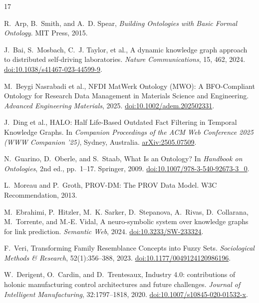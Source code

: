 \documentclass{iosart2x}
\begin{document}

\begin{thebibliography}{17}

R.~Arp, B.~Smith, and A.~D. Spear, \textit{Building Ontologies with Basic Formal Ontology}. MIT Press, 2015.

J.~Bai, S.~Mosbach, C.~J. Taylor, et al., A dynamic knowledge graph approach to distributed self-driving laboratories. \textit{Nature Communications}, 15, 462, 2024. \href{https://doi.org/10.1038/s41467-023-44599-9}{doi:10.1038/s41467-023-44599-9}.

M.~Beygi Nasrabadi et al., NFDI MatWerk Ontology (MWO): A BFO-Compliant Ontology for Research Data Management in Materials Science and Engineering. \textit{Advanced Engineering Materials}, 2025. \href{https://doi.org/10.1002/adem.202502331}{doi:10.1002/adem.202502331}.

J.~Ding et al., HALO: Half Life-Based Outdated Fact Filtering in Temporal Knowledge Graphs. In \textit{Companion Proceedings of the ACM Web Conference 2025 (WWW Companion '25)}, Sydney, Australia. \href{https://arxiv.org/abs/2505.07509}{arXiv:2505.07509}.

N.~Guarino, D.~Oberle, and S.~Staab, What Is an Ontology? In \textit{Handbook on Ontologies}, 2nd ed., pp.~1--17. Springer, 2009. \href{https://doi.org/10.1007/978-3-540-92673-3_0}{doi:10.1007/978-3-540-92673-3\_0}.

L.~Moreau and P.~Groth, PROV-DM: The PROV Data Model. W3C Recommendation, 2013.

M.~Ebrahimi, P.~Hitzler, M.~K. Sarker, D.~Stepanova, A.~Rivas, D.~Collarana, M.~Torrente, and M.-E. Vidal, A neuro-symbolic system over knowledge graphs for link prediction. \textit{Semantic Web}, 2024. \href{https://doi.org/10.3233/SW-233324}{doi:10.3233/SW-233324}.

F.~Veri, Transforming Family Resemblance Concepts into Fuzzy Sets. \textit{Sociological Methods \& Research}, 52(1):356--388, 2023. \href{https://doi.org/10.1177/0049124120986196}{doi:10.1177/0049124120986196}.

W.~Derigent, O.~Cardin, and D.~Trentesaux, Industry 4.0: contributions of holonic manufacturing control architectures and future challenges. \textit{Journal of Intelligent Manufacturing}, 32:1797--1818, 2020. \href{https://doi.org/10.1007/s10845-020-01532-x}{doi:10.1007/s10845-020-01532-x}.


\end{thebibliography}
\end{document}
